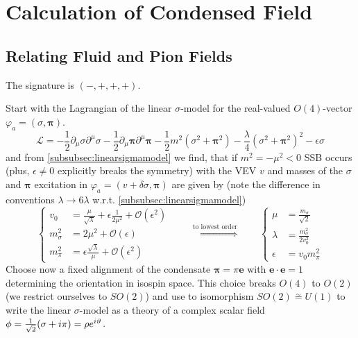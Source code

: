 \chapter{Calculation of Condensed Field}

\section{Relating Fluid and Pion Fields}

The signature is $(-,+,+,+)$.

Start with the Lagrangian of the linear $\sigma$-model for the real-valued $O(4)$-vector $\varphi_a=(\sigma,\mathbf{\pi})$.
\begin{equation}
    \mathscr{L}=-\frac{1}{2}\partial_\mu\sigma\partial^\mu\sigma-\frac{1}{2}\partial_\mu\mathbf{\pi}\partial^\mu\mathbf{\pi}-\frac{1}{2}m^2(\sigma^2+\mathbf{\pi}^2)-\frac{\lambda}{4}(\sigma^2+\mathbf{\pi}^2)^2-\epsilon\sigma
\end{equation}
and from \ref{subsubsec:linearsigmamodel} we find, that if $m^2=-\mu^2<0$ SSB occurs (plus, $\epsilon\neq 0$ explicitly breaks the symmetry) with the VEV $v$ and masses of the $\sigma$ and $\mathbf{\pi}$ excitation in $\varphi_a=(v+\delta\sigma,\mathbf{\pi})$ are given by (note the difference in conventions $\lambda\to 6\lambda$ w.r.t. \ref{subsubsec:linearsigmamodel})
\begin{equation}
    \left\{
    \begin{split}
        v_0         & =\frac{\mu}{\sqrt{\lambda}}+\epsilon\frac{1}{2\mu^2}+\mathcal{O}(\epsilon^2) \\
        m_\sigma^2 & =2\mu^2+\mathcal{O}(\epsilon)                                                \\
        m_\pi^2    & =\epsilon\frac{\sqrt{\lambda}}{\mu}+\mathcal{O}(\epsilon^2)
    \end{split}
    \right.\qquad\overset{\text{to lowest order}}{\iff}\qquad
    \left\{
    \begin{split}
        \mu&=\frac{m_\sigma}{\sqrt{2}}\\
        \lambda&=\frac{m_\sigma^2}{2v_0^2}\\
        \epsilon&=v_0m_\pi^2
    \end{split}
    \right.
    \label{eq:LinearSigmaModel_CouplingsMassesRelation}
\end{equation}
Choose now a fixed alignment of the condensate $\mathbf{\pi}=\pi\mathbf{e}$ with $\mathbf{e}\cdot\mathbf{e}=1$ determining the orientation in isospin space. This choice breaks $O(4)$ to $O(2)$ (we restrict ourselves to $SO(2)$) and use to isomorphism $SO(2)\overset{\sim}{=}U(1)$ to write the linear $\sigma$-model as a theory of a complex scalar field $\phi=\frac{1}{\sqrt{2}}(\sigma+{i}\pi)=\rho e^{{i}\vartheta}$.
